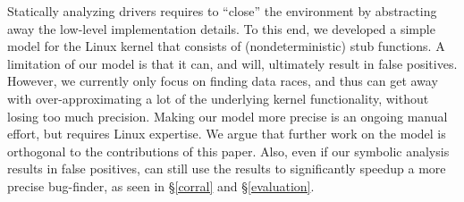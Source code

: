 Statically analyzing drivers requires to ``close'' the environment by abstracting away the low-level implementation details. To this end, we developed a simple model for the Linux kernel that consists of (nondeterministic) stub functions. A limitation of our model is that it can, and will, ultimately result in false positives. However, we currently only focus on finding data races, and thus can get away with over-approximating a lot of the underlying kernel functionality, without losing too much precision. Making our model more precise is an ongoing manual effort, but requires Linux expertise. We argue that further work on the model is orthogonal to the contributions of this paper. Also, even if our symbolic analysis results in false positives, \whoop can still use the results to significantly speedup a more precise bug-finder, as seen in \S\ref{corral} and \S\ref{evaluation}.
